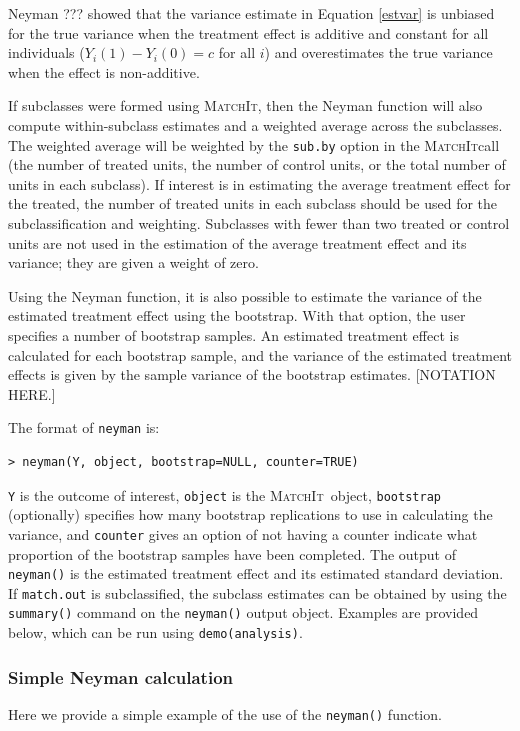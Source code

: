 \documentclass[oneside,letterpaper,titlepage]{article}
\newcommand{\MatchIt}{\textsc{MatchIt}}
\begin{document}
Neyman ??? showed that the variance estimate in Equation \eqref{estvar} is unbiased for the true variance when the treatment effect is additive and constant
for all individuals ($Y_i(1)-Y_i(0)=c$ for all $i$) and overestimates the true variance when the effect is non-additive.  

If subclasses were formed using \MatchIt, then the Neyman function will also compute within-subclass estimates and a weighted average across the subclasses.
The weighted average will be weighted by the {\tt sub.by} option in the \MatchIt call (the number of treated units, the number of control
units, or the total number of units in each subclass).  If interest is in estimating the average treatment effect for the treated, the number of treated units
in each subclass should be used for the subclassification and weighting.  Subclasses with fewer than two treated or control units are not used
in the estimation of the average treatment effect and its variance; they are given a weight of zero.

Using the Neyman function, it is also possible to estimate the variance of the estimated treatment effect using the bootstrap.  With that option,
the user specifies a number of bootstrap samples.  An estimated treatment effect is calculated for each bootstrap sample, and the variance of the estimated
treatment effects is given by the sample variance of the bootstrap estimates.  [NOTATION HERE.]  

The format of {\tt neyman} is:

\begin{verbatim}
> neyman(Y, object, bootstrap=NULL, counter=TRUE)
\end{verbatim}

{\tt Y} is the outcome of interest, {\tt object} is the \MatchIt\ object, {\tt bootstrap} (optionally) 
specifies how many bootstrap replications to use in calculating the variance, and {\tt counter} gives an option of not having a counter indicate
what proportion of the bootstrap samples have been completed.  The output of {\tt neyman()} is the estimated treatment effect and its
estimated standard deviation.   If {\tt match.out} is subclassified, the subclass estimates can be obtained by using the {\tt summary()} command on the
{\tt neyman()} output object.  Examples are provided below, which can be run using {\tt demo(analysis)}.

\subsubsection{Simple Neyman calculation}
Here we provide a simple example of the use of the {\tt neyman()} function.
\end{document}
